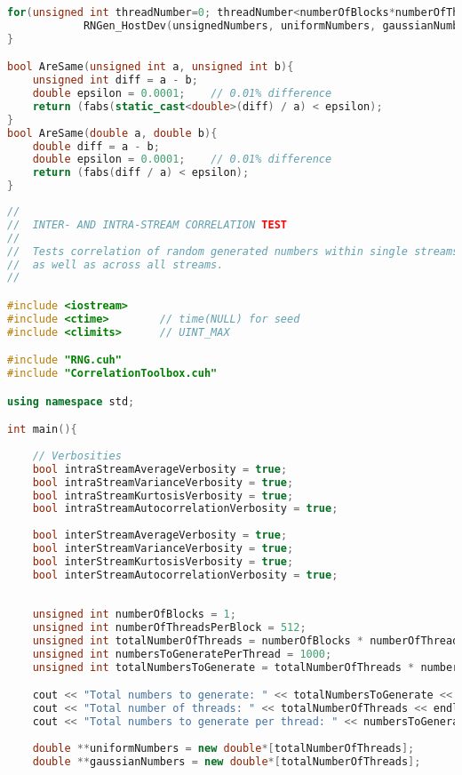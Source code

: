 \begin{lstlisting}[language=C++, caption={\texttt{libraries/CoreLibraries/RandomGenerator/OutputTest.cu}}]
	for(unsigned int threadNumber=0; threadNumber<numberOfBlocks*numberOfThreadsPerBlock; ++threadNumber)
			RNGen_HostDev(unsignedNumbers, uniformNumbers, gaussianNumbers, bimodalNumbers, totalNumbersToGenerate, numbersToGeneratePerThread, seed, threadNumber);
}

bool AreSame(unsigned int a, unsigned int b){
	unsigned int diff = a - b;
	double epsilon = 0.0001;	// 0.01% difference
	return (fabs(static_cast<double>(diff) / a) < epsilon);
}
bool AreSame(double a, double b){
	double diff = a - b;
	double epsilon = 0.0001;	// 0.01% difference
	return (fabs(diff / a) < epsilon);	
}
\end{lstlisting}

\begin{lstlisting}[language=C++, caption={\texttt{libraries/CoreLibraries/RandomGenerator/CorrelationTest.cu}}]
//
//	INTER- AND INTRA-STREAM CORRELATION TEST
//
//	Tests correlation of random generated numbers within single streams
//	as well as across all streams.
//

#include <iostream>
#include <ctime>		// time(NULL) for seed
#include <climits>		// UINT_MAX

#include "RNG.cuh"
#include "CorrelationToolbox.cuh"

using namespace std;

int main(){
	
	// Verbosities
	bool intraStreamAverageVerbosity = true;
	bool intraStreamVarianceVerbosity = true;
	bool intraStreamKurtosisVerbosity = true;
	bool intraStreamAutocorrelationVerbosity = true;
	
	bool interStreamAverageVerbosity = true;
	bool interStreamVarianceVerbosity = true;
	bool interStreamKurtosisVerbosity = true;
	bool interStreamAutocorrelationVerbosity = true;
	
	
	unsigned int numberOfBlocks = 1;
	unsigned int numberOfThreadsPerBlock = 512;
	unsigned int totalNumberOfThreads = numberOfBlocks * numberOfThreadsPerBlock;
	unsigned int numbersToGeneratePerThread = 1000;
	unsigned int totalNumbersToGenerate = totalNumberOfThreads * numbersToGeneratePerThread;

	cout << "Total numbers to generate: " << totalNumbersToGenerate << endl;
	cout << "Total number of threads: " << totalNumberOfThreads << endl;
	cout << "Total numbers to generate per thread: " << numbersToGeneratePerThread << endl;
	
	double **uniformNumbers = new double*[totalNumberOfThreads];
	double **gaussianNumbers = new double*[totalNumberOfThreads];
	

\end{lstlisting}
